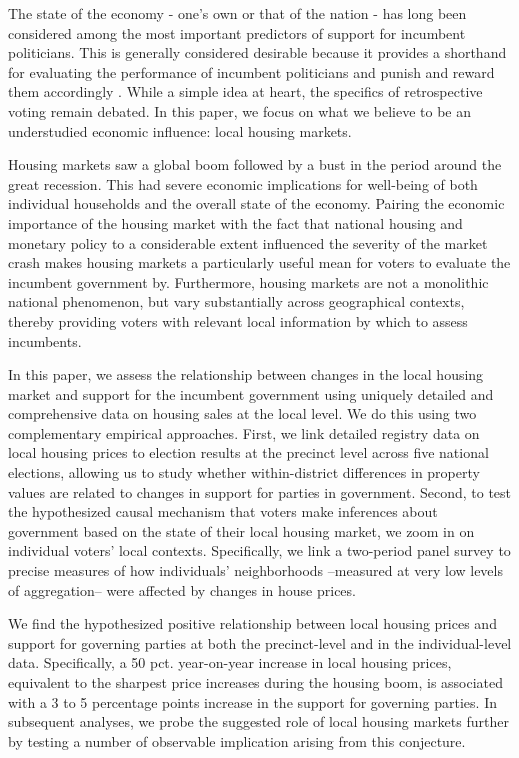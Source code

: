 \documentclass[12pt,a4paper]{article}
\begin{document}
The state of the economy - one’s own or that of the nation - has long been considered among the most important predictors of support for incumbent politicians. This is generally considered desirable because it provides a shorthand for evaluating the performance of incumbent politicians and punish and reward them accordingly \citep{ashworth2012electoral,healy2013retrospective}. While a simple idea at heart, the specifics of retrospective voting remain debated. In this paper, we focus on what we believe to be an understudied economic influence: local housing markets. 

Housing markets saw a global boom followed by a bust in the period around the great recession. This had severe economic implications for well-being of both individual households and the overall state of the economy. Pairing the economic importance of the housing market with the fact that national housing and monetary policy to a considerable extent influenced the severity of the market crash makes housing markets a particularly useful mean for voters to evaluate the incumbent government by. Furthermore, housing markets are not a monolithic national phenomenon, but vary substantially across geographical contexts, thereby providing voters with relevant local information by which to assess incumbents. 

In this paper, we assess the relationship between changes in the local housing market and support for the incumbent government using uniquely detailed and comprehensive data on housing sales at the local level. We do this using two complementary empirical approaches. First, we link detailed registry data on local housing prices to election results at the precinct level across five national elections, allowing us to study whether within-district differences in property values are related to changes in support for parties in government. Second, to test the hypothesized causal mechanism that voters make inferences about government based on the state of their local housing market, we zoom in on individual voters' local contexts. Specifically, we link a two-period panel survey to precise measures of how individuals' neighborhoods --measured at very low levels of aggregation-- were affected by changes in house prices.

We find the hypothesized positive relationship between local housing prices and support for governing parties at both the precinct-level and in the individual-level data. Specifically, a 50 pct. year-on-year increase in local housing prices, equivalent to the sharpest price increases during the housing boom, is associated with a 3 to 5 percentage points increase in the support for governing parties. In subsequent analyses, we probe the suggested role of local housing markets further by testing a number of observable implication arising from this conjecture. 
\end{document}
